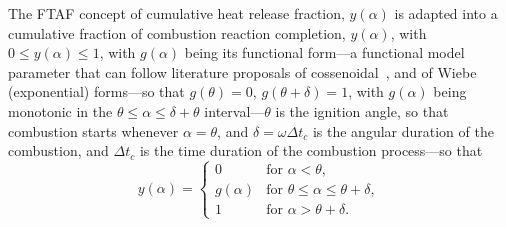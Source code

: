     The FTAF concept of cumulative heat release fraction, $y(\alpha)$ is  adapted  into  a  cumulative  fraction  of  combustion
    reaction completion, $y(\alpha)$, with $0 \leqslant y(\alpha) \leqslant 1$, with $g(\alpha)$ being its  functional  form---a
    functional        model        parameter        that        can        follow        literature         proposals         of
    cossenoidal~\cite{2008-CurtoRissoPL+HernandezAC-JApplPhys}, and of Wiebe~\cite{2013-MartinsJJG-Publindustria}  (exponential)
    forms---so that $g(\theta) = 0$, $g(\theta+\delta) = 1$, with $g(\alpha)$ being monotonic in the  $\theta  \leqslant  \alpha
    \leqslant \delta + \theta$ interval---$\theta$ is the ignition angle, so that combustion starts whenever $\alpha =  \theta$,
    and $\delta = \omega\Delta t_c$ is the angular duration of the combustion, and $\Delta t_c$ is  the  time  duration  of  the
    combustion process---so that
    \begin{equation}
        y(\alpha) =
        \begin{cases}
            0         & \text{for } \alpha < \theta, \\
            g(\alpha) & \text{for } \theta \leqslant \alpha \leqslant \theta + \delta, \\
            1         & \text{for } \alpha > \theta + \delta.
        \end{cases}
        \label{def:y}
    \end{equation}


